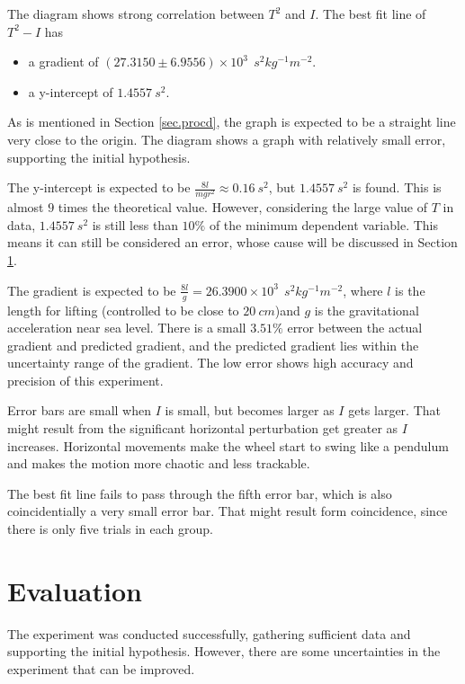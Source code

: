 \documentclass[a4paper]{article}
\begin{document}
\label{sec.discussion}

The diagram shows strong correlation between $T^2$ and $I$. The best fit line of $T^2 - I$ has 

\begin{itemize}
    \item a gradient of $(27.3150 \pm 6.9556) \times 10^3\ \SI{}{s^2kg^{-1}m^{-2}}$.
    \item a y-intercept of $1.4557 \SI{}{s^2}$.
\end{itemize}

As is mentioned in Section \ref{sec.procd}, the graph is expected to be a straight line very close to the origin. The diagram shows a graph with relatively small error, supporting the initial hypothesis.

The y-intercept is expected to be $\frac{8l}{mgr^2} \approx 0.16\SI{}{s^2}$, but $1.4557\SI{}{s^2}$ is found. This is almost $9$ times the theoretical value. However, considering the large value of $T$ in data, $1.4557\SI{}{s^2}$ is still less than $10\%$ of the minimum dependent variable. This means it can still be considered an error, whose cause will be discussed in Section \ref{sec.eval}.

The gradient is expected to be $\frac{8l}{g} = 26.3900 \times 10^3\ \SI{}{s^2kg^{-1}m^{-2}}$, where $l$ is the length for lifting (controlled to be close to $\SI{20}{cm}$)and $g$ is the gravitational acceleration near sea level. There is a small $3.51\%$ error between the actual gradient and predicted gradient, and the predicted gradient lies within the uncertainty range of the gradient. The low error shows high accuracy and precision of this experiment.

Error bars are small when $I$ is small, but becomes larger as $I$ gets larger. That might result from the significant horizontal perturbation get greater as $I$ increases. Horizontal movements make the wheel start to swing like a pendulum and makes the motion more chaotic and less trackable. 

The best fit line fails to pass through the fifth error bar, which is also coincidentially a very small error bar. That might result form coincidence, since there is only five trials in each group.

\section{Evaluation}
\label{sec.eval}

The experiment was conducted successfully, gathering sufficient data and supporting the initial hypothesis. However, there are some uncertainties in the experiment that can be improved. 
\end{document}
